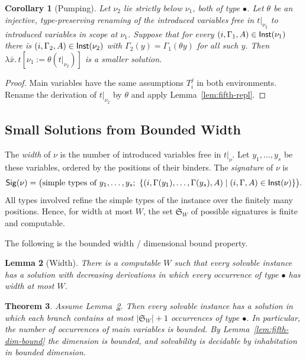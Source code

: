 \documentclass[10pt,a4paper]{article}
\theoremstyle{plain}%
\newtheorem{theorem}{Theorem}
\newtheorem{lemma}[theorem]{Lemma}
\newtheorem{corollary}[theorem]{Corollary}
\begin{document}
\begin{corollary}[Pumping]\label{cor:fifth-pump}
Let $\nu_2$ lie strictly below $\nu_1$, both of type $\bullet$.
Let $\theta$ be an injective, type-preserving renaming of the introduced variables free in $t|_{\nu_2}$ to introduced variables in scope at $\nu_1$.
Suppose that for every $(i,\Gamma_1,A) \in \mathsf{Inst}(\nu_1)$ there is $(i,\Gamma_2,A) \in \mathsf{Inst}(\nu_2)$ with $\Gamma_2(y) = \Gamma_1(\theta y)$ for all such $y$.
Then $\lambda \bar x.\,t[\nu_1 := \theta(t|_{\nu_2})]$ is a smaller solution.
\end{corollary}

\begin{proof}
Main variables have the same assumptions $T_i^j$ in both environments.
Rename the derivation of $t|_{\nu_2}$ by $\theta$ and apply Lemma~\ref{lem:fifth-repl}.
\end{proof}

\subsection{Small Solutions from Bounded Width}

The \emph{width} of $\nu$ is the number of introduced variables free in $t|_\nu$.
Let $y_1, \ldots, y_s$ be these variables, ordered by the positions of their binders.
The \emph{signature} of $\nu$ is
\[
\mathsf{Sig}(\nu) = \bigl(\text{simple types of } y_1,\ldots,y_s;\ \{(i, \Gamma(y_1), \ldots, \Gamma(y_s), A) \mid (i,\Gamma,A) \in \mathsf{Inst}(\nu)\}\bigr).
\]
All types involved refine the simple types of the instance over the finitely many positions.
Hence, for width at most $W$, the set $\mathfrak{S}_W$ of possible signatures is finite and computable.

The following is the bounded width / dimensional bound property.
\begin{lemma}[Width]\label{lem:fifth-width}
There is a computable $W$ such that every solvable instance has a solution with decreasing derivations in which every occurrence of type $\bullet$ has width at most $W$.
\end{lemma}

\begin{theorem}\label{thm:fifth-small}
Assume Lemma~\ref{lem:fifth-width}.
Then every solvable instance has a solution in which each branch contains at most $|\mathfrak{S}_W| + 1$ occurrences of type $\bullet$.
In particular, the number of occurrences of main variables is bounded.
By Lemma~\ref{lem:fifth-dim-bound} the dimension is bounded, and solvability is decidable by inhabitation in bounded dimension.
\end{theorem}
\end{document}
